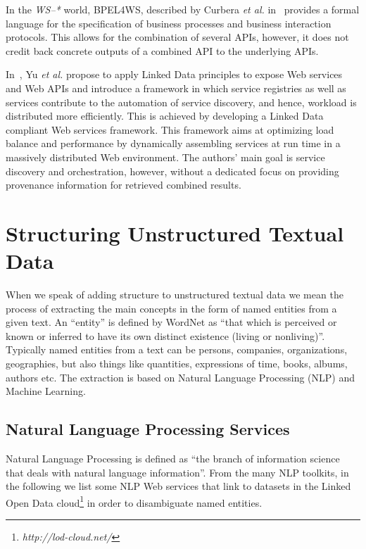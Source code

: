In the \emph{WS--*} world, BPEL4WS, described by Curbera \emph{et al.} in~\cite{Curbera:2003:NSW:944217.944234} provides a formal language for the specification of business processes and business interaction protocols. This allows for the combination of several APIs, however, it does not credit back concrete outputs of a combined API to the underlying APIs.

In~\cite{Yu}, Yu \emph{et al.} propose to apply Linked Data principles to expose 
Web services and Web APIs and introduce a framework in which 
service registries as well as services contribute to the automation 
of service discovery, and hence, workload  is distributed more 
efficiently. This is achieved by developing a Linked Data 
compliant Web services framework. This framework aims at 
optimizing load balance and performance by dynamically 
assembling services at run time in a massively distributed Web 
environment.
The authors' main goal is service discovery and orchestration, however, without a dedicated focus on providing provenance information for retrieved combined results.

\section{Structuring Unstructured Textual Data} \label{sec:structuring}
When we speak of adding structure to unstructured textual data we mean the process of extracting the main concepts in the form of named entities from a given text. An ``entity'' is defined by WordNet as ``that which is perceived or known or inferred to have its own distinct existence (living or nonliving)''. Typically named entities from a text can be persons, companies, organizations, geographies, but also things like quantities, expressions of time, books, albums, authors etc. The extraction is based on Natural Language Processing (NLP) and Machine Learning.

\subsection{Natural Language Processing Services}\label{sec:nlp-services}
Natural Language Processing is defined as ``the branch of information science that deals with natural language information''. From the many NLP toolkits, in the following we list some NLP Web services that link to datasets in the Linked Open Data
cloud\footnote{\textit{http://lod-cloud.net/}} in order to disambiguate named entities.

